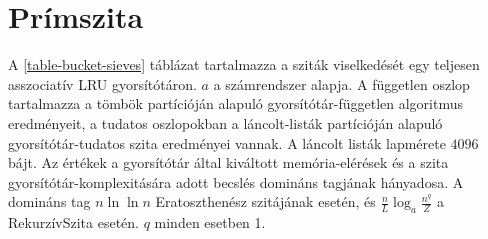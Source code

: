 \documentclass[12pt]{report}
\begin{document}
\section{Prímszita}

A \ref{table-bucket-sieves} táblázat tartalmazza
a sziták viselkedését egy teljesen asszociatív LRU gyorsítótáron.
$a$ a számrendszer alapja.
A független oszlop tartalmazza a tömbök partícióján alapuló
gyorsítótár-független algoritmus eredményeit,
a tudatos oszlopokban a láncolt-listák partícióján
alapuló gyorsítótár-tudatos szita eredményei vannak.
A láncolt listák lapmérete $4096$ bájt.
Az értékek a gyorsítótár által kiváltott memória-elérések
és a szita gyorsítótár-komplexitására adott becslés domináns tagjának
hányadosa.
A domináns tag $n \ln{\ln{n}}$ Eratoszthenész szitájának esetén,
és $\frac{n}{L} \log_{a}{\frac{n^q}{Z}}$ a RekurzívSzita esetén.
$q$ minden esetben 1.
\end{document}
